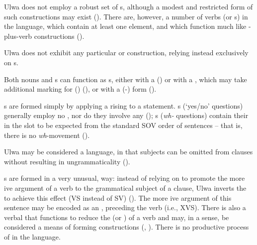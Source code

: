 
Ulwa does not employ a robust set of s, although a modest and restricted form of such constructions may exist (). There are, however, a number of  verbs (or s) in the language, which contain at least one  element, and which function much like -plus-verb constructions ().

Ulwa does not exhibit any particular  or  construction, relying instead exclusively on s.

Both nouns and s can function as s, either with a  () or with a , which may take additional marking for ()  (), or with a  (-)  form ().



s are formed simply by applying a rising  to a  statement. s (‘yes/no’ questions) generally employ no  , nor do they involve any  (); s (\textit{wh-} questions) contain their  in the  slot to be expected from the standard SOV order of  sentences -- that is, there is no \textit{wh}-movement ().

Ulwa may be considered a  language, in that subjects can be omitted from clauses without resulting in ungrammaticality ().

s are formed in a very unusual,  way: instead of relying on  to promote the more ive argument of a  verb to the grammatical subject of a clause, Ulwa  inverts the  to achieve this effect (VS instead of SV) (). The more ive argument of this  sentence may be encoded as an  , preceding the verb (i.e., XVS). There is also a verbal  that functions to  reduce the  (or ) of a verb and may, in a sense, be considered a means of forming  constructions (, ). There is no productive process of  in the language.

